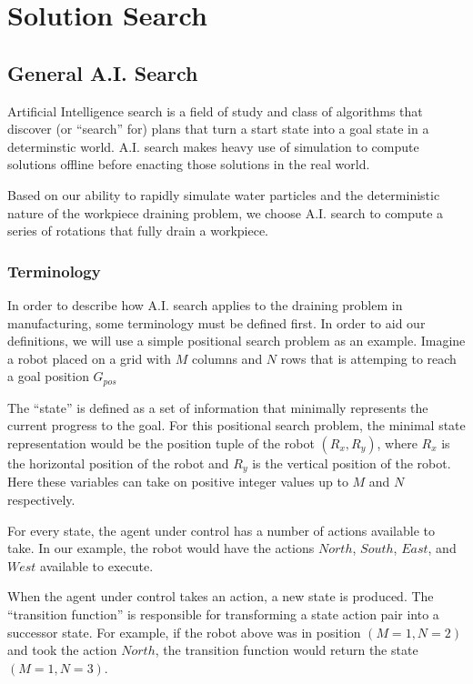 								\chapter{Solution Search}

\section{General A.I. Search}

Artificial Intelligence search is a field of study and class of algorithms that discover (or ``search'' for) plans that turn a start state into a goal state in a determinstic world. A.I. search makes heavy use of simulation to compute solutions offline before enacting those solutions in the real world.

Based on our ability to rapidly simulate water particles and the deterministic nature of the workpiece draining problem, we choose A.I. search to compute a series of rotations that fully drain a workpiece.

	\subsection{Terminology}

In order to describe how A.I. search applies to the draining problem in manufacturing, some terminology must be defined first. In order to aid our definitions, we will use a simple positional search problem as an example. Imagine a robot placed on a grid with $M$ columns and $N$ rows that is attemping to reach a goal position $G_{pos}$


The ``state'' is defined as a set of information that minimally represents the current progress to the goal. For this positional search problem, the minimal state representation would be the position tuple of the robot $(R_x,R_y)$, where $R_x$ is the horizontal position of the robot and $R_y$ is the vertical position of the robot. Here these variables can take on positive integer values up to $M$ and $N$ respectively.

For every state, the agent under control has a number of actions available to take. In our example, the robot would have the actions $North$, $South$, $East$, and $West$ available to execute.

When the agent under control takes an action, a new state is produced. The ``transition function'' is responsible for transforming a state action pair into a successor state. For example, if the robot above was in position $(M = 1, N = 2)$ and took the action $North$, the transition function would return the state $(M = 1, N = 3)$.

